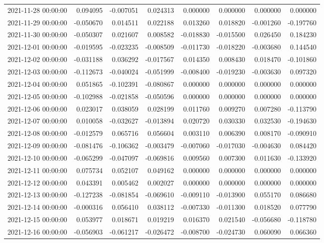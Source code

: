 \begin{tabular}{lrrrrrrr}
2021-11-28 00:00:00 & 0.094095 & -0.007051 & 0.024313 & 0.000000 & 0.000000 & 0.000000 & 0.000000 \\
2021-11-29 00:00:00 & -0.050670 & 0.014511 & 0.022188 & 0.013260 & 0.018820 & -0.001260 & -0.197760 \\
2021-11-30 00:00:00 & -0.050307 & 0.021607 & 0.008582 & -0.018830 & -0.015500 & 0.026450 & 0.184230 \\
2021-12-01 00:00:00 & -0.019595 & -0.023235 & -0.008509 & -0.011730 & -0.018220 & -0.003680 & 0.144540 \\
2021-12-02 00:00:00 & -0.031188 & 0.036292 & -0.017567 & 0.014350 & 0.008430 & 0.018470 & -0.101860 \\
2021-12-03 00:00:00 & -0.112673 & -0.040024 & -0.051999 & -0.008400 & -0.019230 & -0.003630 & 0.097320 \\
2021-12-04 00:00:00 & 0.051865 & -0.102391 & -0.080867 & 0.000000 & 0.000000 & 0.000000 & 0.000000 \\
2021-12-05 00:00:00 & -0.102988 & -0.021858 & -0.050596 & 0.000000 & 0.000000 & 0.000000 & 0.000000 \\
2021-12-06 00:00:00 & 0.023017 & 0.038059 & 0.028199 & 0.011760 & 0.009270 & 0.007280 & -0.113790 \\
2021-12-07 00:00:00 & 0.010058 & -0.032627 & -0.013894 & 0.020720 & 0.030330 & 0.032530 & -0.194630 \\
2021-12-08 00:00:00 & -0.012579 & 0.065716 & 0.056604 & 0.003110 & 0.006390 & 0.008170 & -0.090910 \\
2021-12-09 00:00:00 & -0.081476 & -0.106362 & -0.003479 & -0.007060 & -0.017030 & -0.004630 & 0.084420 \\
2021-12-10 00:00:00 & -0.065299 & -0.047097 & -0.069816 & 0.009560 & 0.007300 & 0.011630 & -0.133920 \\
2021-12-11 00:00:00 & 0.075734 & 0.052107 & 0.049162 & 0.000000 & 0.000000 & 0.000000 & 0.000000 \\
2021-12-12 00:00:00 & 0.043391 & 0.005462 & 0.002027 & 0.000000 & 0.000000 & 0.000000 & 0.000000 \\
2021-12-13 00:00:00 & -0.127238 & -0.081854 & -0.069610 & -0.009110 & -0.013900 & 0.055170 & 0.086680 \\
2021-12-14 00:00:00 & -0.000316 & 0.056410 & 0.038112 & -0.007330 & -0.011300 & 0.018520 & 0.077790 \\
2021-12-15 00:00:00 & 0.053977 & 0.018671 & 0.019219 & 0.016370 & 0.021540 & -0.056680 & -0.118780 \\
2021-12-16 00:00:00 & -0.056903 & -0.061217 & -0.026472 & -0.008700 & -0.024730 & 0.060090 & 0.066360 \\

\end{tabular}
